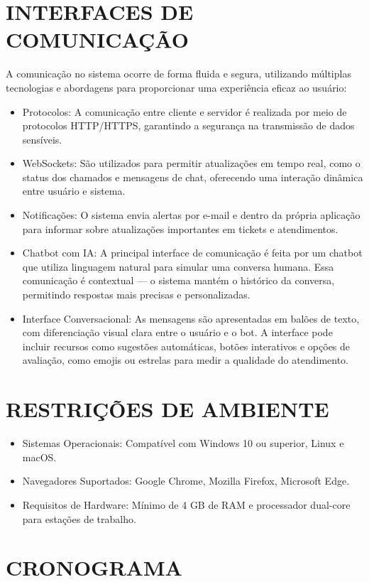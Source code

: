 \documentclass[a4paper,12pt]{article}
\begin{document}
\section{INTERFACES DE COMUNICAÇÃO}
A comunicação no sistema ocorre de forma fluida e segura, utilizando múltiplas tecnologias e abordagens para proporcionar uma experiência eficaz ao usuário:
\begin{itemize}
    \item Protocolos: A comunicação entre cliente e servidor é realizada por meio de protocolos HTTP/HTTPS, garantindo a segurança na transmissão de dados sensíveis.
    \item WebSockets: São utilizados para permitir atualizações em tempo real, como o status dos chamados e mensagens de chat, oferecendo uma interação dinâmica entre usuário e sistema.
    \item Notificações: O sistema envia alertas por e-mail e dentro da própria aplicação para informar sobre atualizações importantes em tickets e atendimentos.
    \item Chatbot com IA: A principal interface de comunicação é feita por um chatbot que utiliza linguagem natural para simular uma conversa humana. Essa comunicação é contextual — o sistema mantém o histórico da conversa, permitindo respostas mais precisas e personalizadas.
    \item Interface Conversacional: As mensagens são apresentadas em balões de texto, com diferenciação visual clara entre o usuário e o bot. A interface pode incluir recursos como sugestões automáticas, botões interativos e opções de avaliação, como emojis ou estrelas para medir a qualidade do atendimento.
\end{itemize}

\section{RESTRIÇÕES DE AMBIENTE}
\begin{itemize}
    \item Sistemas Operacionais: Compatível com Windows 10 ou superior, Linux e macOS.
    \item Navegadores Suportados: Google Chrome, Mozilla Firefox, Microsoft Edge.
    \item Requisitos de Hardware: Mínimo de 4 GB de RAM e processador dual-core para estações de trabalho.
\end{itemize}

\section{CRONOGRAMA}
\end{document}
